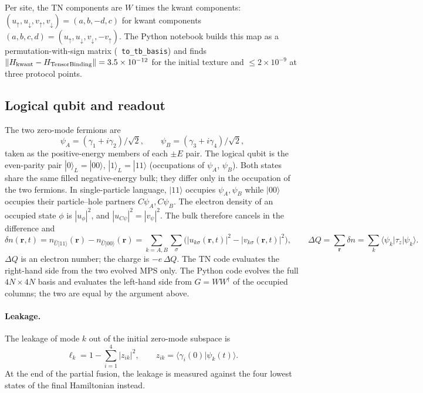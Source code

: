 \documentclass[11pt]{article}
\renewcommand{\code}[1]{\texttt{\hyphenchar\font=-1 #1}}
\newcommand{\ket}[1]{|#1\rangle}
\newcommand{\bra}[1]{\langle#1|}
\begin{document}
Per site, the TN components are $W$ times the kwant components: $(u_\uparrow, u_\downarrow, v_\uparrow, v_\downarrow) = (a, b, -d, c)$
for kwant components $(a,b,c,d) = (u_\uparrow, u_\downarrow, v_\downarrow, -v_\uparrow)$. The Python notebook builds this map as a
permutation-with-sign matrix (\code{to\_tb\_basis}) and finds $\|H_{\rm kwant} - H_{\rm TensorBinding}\| = 3.5\times10^{-12}$ for the
initial texture and $\le 2\times10^{-9}$ at three protocol points.

\subsection{Logical qubit and readout}

The two zero-mode fermions are
\[
\psi_A = (\gamma_1 + i\gamma_2)/\sqrt2, \qquad \psi_B = (\gamma_3 + i\gamma_4)/\sqrt2,
\]
taken as the positive-energy members of each $\pm E$ pair. The logical qubit is the even-parity pair $\ket0_L = \ket{00}$,
$\ket1_L = \ket{11}$ (occupations of $\psi_A$, $\psi_B$). Both states share the same filled negative-energy bulk; they differ only in
the occupation of the two fermions. In single-particle language, $\ket{11}$ occupies $\psi_A,\psi_B$ while $\ket{00}$ occupies their
particle--hole partners $C\psi_A, C\psi_B$. The electron density of an occupied state $\phi$ is $|u_\phi|^2$, and
$|u_{C\psi}|^2 = |v_\psi|^2$. The bulk therefore cancels in the difference and
\[
\delta n(\mathbf r,t) = n_{\hat U\ket{11}}(\mathbf r) - n_{\hat U\ket{00}}(\mathbf r)
 = \sum_{k=A,B}\sum_\sigma \bigl(|u_{k\sigma}(\mathbf r,t)|^2 - |v_{k\sigma}(\mathbf r,t)|^2\bigr),
\qquad
\Delta Q = \sum_{\mathbf r}\delta n = \sum_k \bra{\psi_k}\tau_z\ket{\psi_k}.
\]
$\Delta Q$ is an electron number; the charge is $-e\,\Delta Q$. The TN code evaluates the right-hand side from the two evolved MPS
only. The Python code evolves the full $4N\times4N$ basis and evaluates the left-hand side from $G = WW^\dagger$ of the occupied columns;
the two are equal by the argument above.

\paragraph{Leakage.} The leakage of mode $k$ out of the initial zero-mode subspace is
\[
\ell_k = 1 - \sum_{i=1}^{4} |z_{ik}|^2, \qquad z_{ik} = \langle\gamma_i(0)|\psi_k(t)\rangle .
\]
At the end of the partial fusion, the leakage is measured against the four lowest states of the final Hamiltonian instead.
\end{document}
